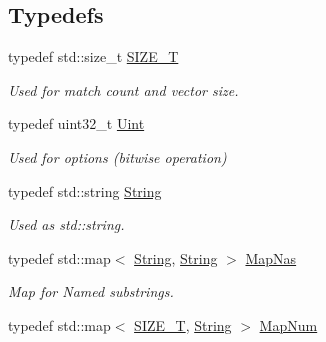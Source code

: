 \subsection*{Typedefs}
\begin{DoxyCompactItemize}
\item 
typedef std\+::size\+\_\+t \hyperlink{namespacejpcre2_a2aac465ddcb123560c7c8215dd69246c}{S\+I\+Z\+E\+\_\+T}\hypertarget{namespacejpcre2_a2aac465ddcb123560c7c8215dd69246c}{}\label{namespacejpcre2_a2aac465ddcb123560c7c8215dd69246c}

\begin{DoxyCompactList}\small\item\em Used for match count and vector size. \end{DoxyCompactList}\item 
typedef uint32\+\_\+t \hyperlink{namespacejpcre2_a078242d38221a13fb3543b9edd78c099}{Uint}\hypertarget{namespacejpcre2_a078242d38221a13fb3543b9edd78c099}{}\label{namespacejpcre2_a078242d38221a13fb3543b9edd78c099}

\begin{DoxyCompactList}\small\item\em Used for options (bitwise operation) \end{DoxyCompactList}\item 
typedef std\+::string \hyperlink{namespacejpcre2_a91f03070152fb228bc116c5a737f1d16}{String}\hypertarget{namespacejpcre2_a91f03070152fb228bc116c5a737f1d16}{}\label{namespacejpcre2_a91f03070152fb228bc116c5a737f1d16}

\begin{DoxyCompactList}\small\item\em Used as std\+::string. \end{DoxyCompactList}\item 
typedef std\+::map$<$ \hyperlink{namespacejpcre2_a91f03070152fb228bc116c5a737f1d16}{String}, \hyperlink{namespacejpcre2_a91f03070152fb228bc116c5a737f1d16}{String} $>$ \hyperlink{namespacejpcre2_a20bd901c9ca3c949806aa6b9e324f6cf}{Map\+Nas}\hypertarget{namespacejpcre2_a20bd901c9ca3c949806aa6b9e324f6cf}{}\label{namespacejpcre2_a20bd901c9ca3c949806aa6b9e324f6cf}

\begin{DoxyCompactList}\small\item\em Map for Named substrings. \end{DoxyCompactList}\item 
typedef std\+::map$<$ \hyperlink{namespacejpcre2_a2aac465ddcb123560c7c8215dd69246c}{S\+I\+Z\+E\+\_\+T}, \hyperlink{namespacejpcre2_a91f03070152fb228bc116c5a737f1d16}{String} $>$ \hyperlink{namespacejpcre2_a947e37f0e4a1678157e7f1f855638e82}{Map\+Num}\hypertarget{namespacejpcre2_a947e37f0e4a1678157e7f1f855638e82}{}\label{namespacejpcre2_a947e37f0e4a1678157e7f1f855638e82}


\end{DoxyCompactItemize}
